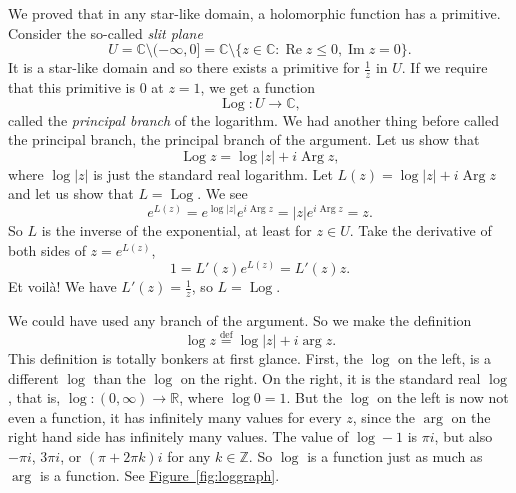 \documentclass[12pt,openany]{book}
\renewcommand{\Re}{\operatorname{Re}}
\renewcommand{\Im}{\operatorname{Im}}
\newcommand{\Arg}{\operatorname{Arg}}
\newcommand{\Log}{\operatorname{Log}}
\newcommand{\sabs}[1]{\lvert {#1} \rvert}
\newcommand{\C}{{\mathbb{C}}}
\newcommand{\R}{{\mathbb{R}}}
\newcommand{\Z}{{\mathbb{Z}}}
\newcommand{\myindex}[1]{#1\index{#1}}
\theoremstyle{plain}
\theoremstyle{remark}
\theoremstyle{definition}
\theoremstyle{exercise}
\theoremstyle{example}
\newcommand{\figureref}[1]{\hyperref[#1]{Figure~\ref*{#1}}}
\begin{document}
We proved that in any star-like domain, a holomorphic function has a
primitive.  Consider the so-called \emph{\myindex{slit plane}}
\begin{equation*}
U = \C \setminus (-\infty,0] = \C \setminus \bigl\{ z \in \C : \Re z \leq 0 , \Im z = 0 \bigr\}.
\end{equation*}
It is a star-like domain and
so there exists a
primitive for $\frac{1}{z}$ in $U$.
If we
require that this primitive is $0$ at $z=1$,
we get a function
\begin{equation*}
\operatorname{Log} \colon U \to \C ,
\end{equation*}
called the \emph{\myindex{principal branch}} of the logarithm.
We had another thing before called the principal branch, 
the principal branch of the argument.  Let us show that
\begin{equation*}
\Log z = \log \sabs{z} + i \Arg z ,
\end{equation*}
where $\log \sabs{z}$ is just the standard real logarithm.  Let
$L(z) = \log \sabs{z} + i \Arg z$ and let us show that $L = \Log$.  We see
\begin{equation*}
e^{L(z)}
=
e^{\log \sabs{z}} e^{i \Arg z}
=
\sabs{z} e^{i \Arg z} = z .
\end{equation*}
So $L$ is the inverse of the exponential, at least for $z \in U$.
Take the derivative of both sides of $z = e^{L(z)}$,
\begin{equation*}
1 = L'(z) e^{L(z)} = L'(z) z .
\end{equation*}
Et voil\`a!  We have $L'(z) = \frac{1}{z}$, so $L = \Log$.

We could have used any branch of the argument.  So we 
make the definition
\begin{equation*}
\log z \overset{\text{def}}{=} \log \sabs{z} + i \arg z .
\end{equation*}
This definition is totally bonkers at first glance.  First, the $\log$ on the
left, is a different $\log$ than the $\log$ on the right.  On the right, it is the
standard real $\log$, that is, $\log \colon (0,\infty) \to \R$,
where $\log 0 = 1$.
But the $\log$ on the left
is now not even a function, it has infinitely many values for every $z$,
since the $\arg$ on the right hand side has infinitely many values.
The value of $\log -1$ is $\pi i$, but also $-\pi i$, $3\pi i$,
or $(\pi + 2\pi k)i$ for any $k \in \Z$.  So $\log$ is a function just as much
as $\arg$ is a function.  See \figureref{fig:loggraph}.
\end{document}
